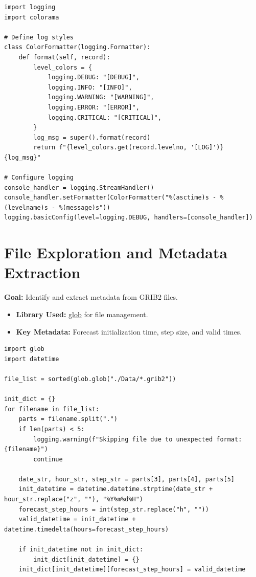 \documentclass[a4paper,10pt]{article}
\begin{document}
\begin{verbatim}
import logging
import colorama

# Define log styles
class ColorFormatter(logging.Formatter):
    def format(self, record):
        level_colors = {
            logging.DEBUG: "[DEBUG]",
            logging.INFO: "[INFO]",
            logging.WARNING: "[WARNING]",
            logging.ERROR: "[ERROR]",
            logging.CRITICAL: "[CRITICAL]",
        }
        log_msg = super().format(record)
        return f"{level_colors.get(record.levelno, '[LOG]')} {log_msg}"

# Configure logging
console_handler = logging.StreamHandler()
console_handler.setFormatter(ColorFormatter("%(asctime)s - %(levelname)s - %(message)s"))
logging.basicConfig(level=logging.DEBUG, handlers=[console_handler])
\end{verbatim}

\section{File Exploration and Metadata Extraction}
\textbf{Goal:} Identify and extract metadata from GRIB2 files.

\begin{itemize}
    \item \textbf{Library Used:} \href{https://docs.python.org/3/library/glob.html}{glob} for file management.
    \item \textbf{Key Metadata:} Forecast initialization time, step size, and valid times.
\end{itemize}

\begin{verbatim}
import glob
import datetime

file_list = sorted(glob.glob("./Data/*.grib2"))

init_dict = {}
for filename in file_list:
    parts = filename.split(".")
    if len(parts) < 5:
        logging.warning(f"Skipping file due to unexpected format: {filename}")
        continue

    date_str, hour_str, step_str = parts[3], parts[4], parts[5]
    init_datetime = datetime.datetime.strptime(date_str + hour_str.replace("z", ""), "%Y%m%d%H")
    forecast_step_hours = int(step_str.replace("h", ""))
    valid_datetime = init_datetime + datetime.timedelta(hours=forecast_step_hours)

    if init_datetime not in init_dict:
        init_dict[init_datetime] = {}
    init_dict[init_datetime][forecast_step_hours] = valid_datetime
\end{verbatim}
\end{document}
